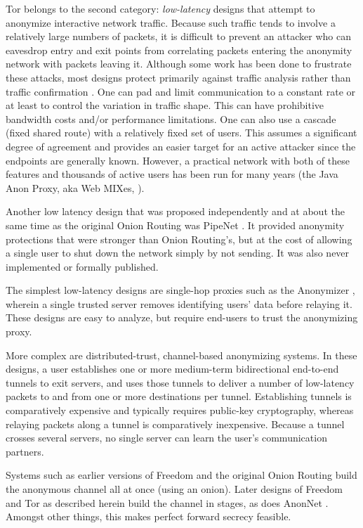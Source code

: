 \documentclass[times,10pt,twocolumn]{article}
\begin{document}
Tor belongs to the second category: \emph{low-latency} designs that
attempt to anonymize interactive network traffic.  Because such
traffic tends to involve a relatively large numbers of packets, it is
difficult to prevent an attacker who can eavesdrop entry and exit
points from correlating packets entering the anonymity network with
packets leaving it. Although some work has been done to frustrate
these attacks, most designs protect primarily against traffic analysis
rather than traffic confirmation \cite{or-jsac98}.  One can pad and
limit communication to a constant rate or at least to control the
variation in traffic shape. This can have prohibitive bandwidth costs
and/or performance limitations. One can also use a cascade (fixed
shared route) with a relatively fixed set of users. This assumes a
significant degree of agreement and provides an easier target for an active
attacker since the endpoints are generally known. However, a practical
network with both of these features and thousands of active users has
been run for many years (the Java Anon Proxy, aka Web MIXes,
\cite{web-mix}).

Another low latency design that was proposed independently and at
about the same time as the original Onion Routing was PipeNet \cite{pipenet}.
It provided anonymity protections that were stronger than Onion Routing's,
but at the cost of allowing a single user to shut down the network simply
by not sending. It was also never implemented or formally published.

The simplest low-latency designs are single-hop proxies such as the
Anonymizer \cite{anonymizer}, wherein a single trusted server removes
identifying users' data before relaying it.  These designs are easy to
analyze, but require end-users to trust the anonymizing proxy.

More complex are distributed-trust, channel-based anonymizing systems.  In
these designs, a user establishes one or more medium-term bidirectional
end-to-end tunnels to exit servers, and uses those tunnels to deliver a
number of low-latency packets to and from one or more destinations per
tunnel.  Establishing tunnels is comparatively expensive and typically
requires public-key cryptography, whereas relaying packets along a tunnel is
comparatively inexpensive.  Because a tunnel crosses several servers, no
single server can learn the user's communication partners.

Systems such as earlier versions of Freedom and the original Onion Routing
build the anonymous channel all at once (using an onion). 
Later designs of Freedom and Tor as described herein build
the channel in stages, as does AnonNet
\cite{anonnet}. Amongst other things, this makes perfect forward
secrecy feasible.
\end{document}
